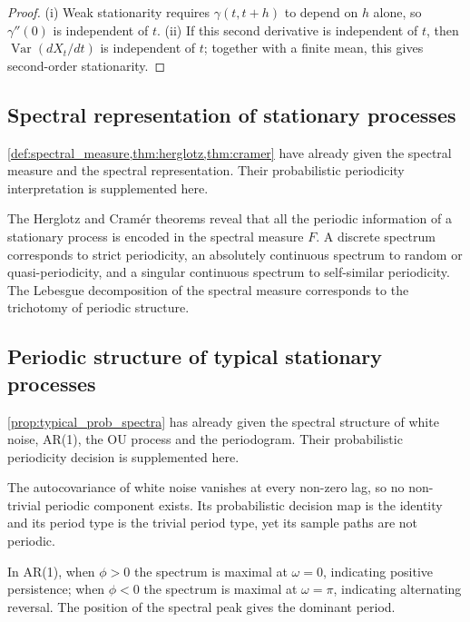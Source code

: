\begin{proof}
(i) Weak stationarity requires $\gamma(t,t+h)$ to depend on $h$ alone, so $\gamma''(0)$ is independent of $t$.
(ii) If this second derivative is independent of $t$, then $\operatorname{Var}(dX_t/dt)$ is independent of $t$; together with a finite mean, this gives second-order stationarity.
\end{proof}

\subsection{Spectral representation of stationary processes}

\cref{def:spectral_measure,thm:herglotz,thm:cramer} have already given the spectral measure and the spectral representation. Their probabilistic periodicity interpretation is supplemented here.

\begin{remark}\label{rem:spectral_period_relation_2}
The Herglotz and Cramér theorems reveal that all the periodic information of a stationary process is encoded in the spectral measure $F$. A discrete spectrum corresponds to strict periodicity, an absolutely continuous spectrum to random or quasi-periodicity, and a singular continuous spectrum to self-similar periodicity. The Lebesgue decomposition of the spectral measure corresponds to the trichotomy of periodic structure.
\end{remark}

\subsection{Periodic structure of typical stationary processes}

\cref{prop:typical_prob_spectra} has already given the spectral structure of white noise, AR(1), the OU process and the periodogram. Their probabilistic periodicity decision is supplemented here.

\begin{example}\label{ex:white_noise_no_period}
The autocovariance of white noise vanishes at every non-zero lag, so no non-trivial periodic component exists. Its probabilistic decision map is the identity and its period type is the trivial period type, yet its sample paths are not periodic.
\end{example}

\begin{example}\label{ex:ar1_peak}
In AR(1), when $\phi>0$ the spectrum is maximal at $\omega=0$, indicating positive persistence; when $\phi<0$ the spectrum is maximal at $\omega=\pi$, indicating alternating reversal. The position of the spectral peak gives the dominant period.
\end{example}

